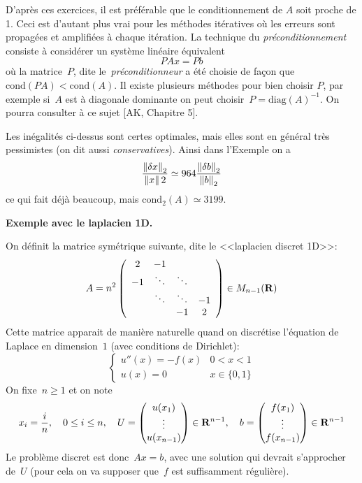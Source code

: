 \begin{remark}
	D'après ces exercices, il est préférable que le conditionnement de $A$ soit
	proche de 1. Ceci est d'autant plus vrai pour les méthodes itératives où
	les erreurs sont propagées et amplifiées à chaque itération. La technique
	du \emph{préconditionnement} consiste à considérer un système linéaire
	équivalent
	\[
		PAx = Pb
	\]
	où la matrice~$P$, dite le~\emph{préconditionneur} a été choisie de façon
	que $\mathrm{cond} (PA) < \mathrm{cond}(A)$. Il existe plusieurs méthodes
	pour bien choisir $P$, par exemple si~$A$ est à diagonale dominante on peut
	choisir~$P=\mathrm{diag}(A)^{-1}$.
	On pourra consulter à ce sujet [AK, Chapitre 5].
\end{remark}

\begin{remark}
\label{rm:cond}
Les inégalités ci-dessus sont certes optimales, mais elles sont en général
très pessimistes (on dit aussi \emph{conservatives}). Ainsi dans
l'Exemple on a
\begin{displaymath}
\frac{\left\|\delta x\right\|_{2}}{\left\|x\right\|{2}} \simeq 964 \frac{\left\|\delta
b\right\|_{2}}{\left\|b\right\|_{2}}
\end{displaymath}
ce qui fait déjà beaucoup, mais $\mathrm{cond}_2(A) \simeq 3199$.
\end{remark}

{\bf Exemple avec le laplacien 1D.}

On définit la matrice symétrique suivante, dite le <<laplacien discret 1D>>:
\begin{equation}
\label{eq:A}
A = n^2 \left(\begin{array}{cccc}
2 & -1 & &  \\
-1 & \ddots & \ddots & \\
  & \ddots & \ddots & -1 \\
 & & -1 & 2
\end{array}\right) \in M_{n-1}(\mathbf{R})
\end{equation}
Cette matrice apparait de manière naturelle quand on discrétise l'équation de
Laplace en dimension~$1$ (avec conditions de Dirichlet):
\begin{equation*}
	\begin{cases}
		u''(x)  = -f(x) & 0 < x < 1 \\
		u(x) = 0 & x\in\{0,1\}
\end{cases}
\end{equation*}
On fixe~$n\ge 1$ et on note
\begin{displaymath}
	x_i = \frac{i}{n}, \quad 0 \leq i \leq n, \quad U = \begin{pmatrix}u(x_1)
		\\ \vdots \\ u(x_{n-1})\end{pmatrix} \in \mathbf{R}^{n-1}, \quad  b =
		\begin{pmatrix}f(x_1) \\ \vdots \\ f(x_{n-1})\end{pmatrix} \in \mathbf{R}^{n-1}
\end{displaymath}
Le problème discret est donc~$Ax=b$, avec une solution qui devrait
s'approcher de~$U$ (pour cela on va supposer que~$f$ est suffisamment
régulière).


